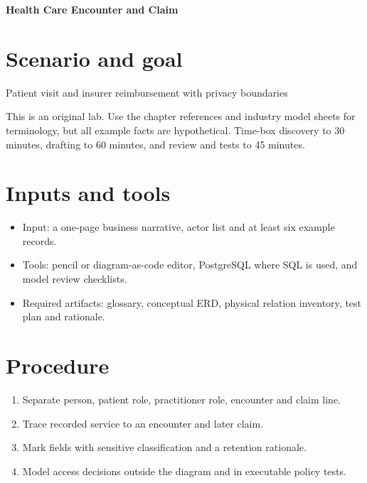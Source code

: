 \documentclass[11pt,letterpaper]{article}
\begin{document}
\begin{center}
{\LARGE\bfseries\color{navy} Health Care Encounter and Claim}\par
\vspace{0.25em}{\large Practical modeling laboratory}\par
{}
\end{center}
\vspace{0.8em}
\section{Scenario and goal}
Patient visit and insurer reimbursement with privacy boundaries

This is an original lab. Use the chapter references and industry model sheets for terminology, but all example facts are hypothetical. Time-box discovery to 30 minutes, drafting to 60 minutes, and review and tests to 45 minutes.


\section{Inputs and tools}
\begin{itemize}
\item Input: a one-page business narrative, actor list and at least six example records.
\item Tools: pencil or diagram-as-code editor, PostgreSQL where SQL is used, and model review checklists.
\item Required artifacts: glossary, conceptual ERD, physical relation inventory, test plan and rationale.
\end{itemize}

\section{Procedure}
\begin{enumerate}
\item Separate person, patient role, practitioner role, encounter and claim line.
\item Trace recorded service to an encounter and later claim.
\item Mark fields with sensitive classification and a retention rationale.
\item Model access decisions outside the diagram and in executable policy tests.
\end{enumerate}
\end{document}
